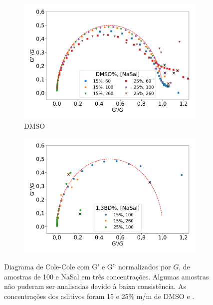 		\begin{figure}[h]
			\begin{subfigure}[t]{0.5\textwidth}
				\centering
				\includegraphics[width=\textwidth]{imagens/reologia/colecole_dmso}
				\caption{DMSO}
				\label{fig:colecole_dmso}
			\end{subfigure} %
			\begin{subfigure}[t]{0.5\textwidth}
				\centering
				\includegraphics[width=\textwidth]{imagens/reologia/colecole_13bd}
				\caption{\BD{}}
				\label{fig:colecole_13bd}
			\end{subfigure} %
			\caption{Diagrama de Cole-Cole com G' e G'' normalizados por \(G\), de amostras de \CTAB{} 100 \mM{} e NaSal em três concentrações. Algumas amostras não puderam ser analisadas devido à baixa consistência. As concentrações dos aditivos foram 15 e 25\% m/m de DMSO e \BD{}.}
			\label{fig:colecole_dmso_13bd}
		\end{figure}
		
